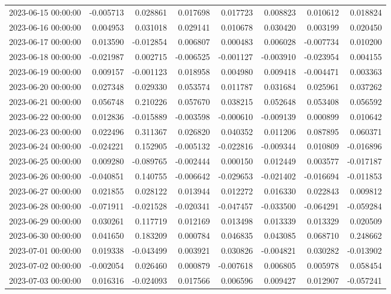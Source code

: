 \begin{tabular}{lrrrrrrr}
2023-06-15 00:00:00 & -0.005713 & 0.028861 & 0.017698 & 0.017723 & 0.008823 & 0.010612 & 0.018824 \\
2023-06-16 00:00:00 & 0.004953 & 0.031018 & 0.029141 & 0.010678 & 0.030420 & 0.003199 & 0.020450 \\
2023-06-17 00:00:00 & 0.013590 & -0.012854 & 0.006807 & 0.000483 & 0.006028 & -0.007734 & 0.010200 \\
2023-06-18 00:00:00 & -0.021987 & 0.002715 & -0.006525 & -0.001127 & -0.003910 & -0.023954 & 0.004155 \\
2023-06-19 00:00:00 & 0.009157 & -0.001123 & 0.018958 & 0.004980 & 0.009418 & -0.004471 & 0.003363 \\
2023-06-20 00:00:00 & 0.027348 & 0.029330 & 0.053574 & 0.011787 & 0.031684 & 0.025961 & 0.037262 \\
2023-06-21 00:00:00 & 0.056748 & 0.210226 & 0.057670 & 0.038215 & 0.052648 & 0.053408 & 0.056592 \\
2023-06-22 00:00:00 & 0.012836 & -0.015889 & -0.003598 & -0.000610 & -0.009139 & 0.000899 & 0.010642 \\
2023-06-23 00:00:00 & 0.022496 & 0.311367 & 0.026820 & 0.040352 & 0.011206 & 0.087895 & 0.060371 \\
2023-06-24 00:00:00 & -0.024221 & 0.152905 & -0.005132 & -0.022816 & -0.009344 & 0.010809 & -0.016896 \\
2023-06-25 00:00:00 & 0.009280 & -0.089765 & -0.002444 & 0.000150 & 0.012449 & 0.003577 & -0.017187 \\
2023-06-26 00:00:00 & -0.040851 & 0.140755 & -0.006642 & -0.029653 & -0.021402 & -0.016694 & -0.011853 \\
2023-06-27 00:00:00 & 0.021855 & 0.028122 & 0.013944 & 0.012272 & 0.016330 & 0.022843 & 0.009812 \\
2023-06-28 00:00:00 & -0.071911 & -0.021528 & -0.020341 & -0.047457 & -0.033500 & -0.064291 & -0.059284 \\
2023-06-29 00:00:00 & 0.030261 & 0.117719 & 0.012169 & 0.013498 & 0.013339 & 0.013329 & 0.020509 \\
2023-06-30 00:00:00 & 0.041650 & 0.183209 & 0.000784 & 0.046835 & 0.043085 & 0.068710 & 0.248662 \\
2023-07-01 00:00:00 & 0.019338 & -0.043499 & 0.003921 & 0.030826 & -0.004821 & 0.030282 & -0.013902 \\
2023-07-02 00:00:00 & -0.002054 & 0.026460 & 0.000879 & -0.007618 & 0.006805 & 0.005978 & 0.058454 \\
2023-07-03 00:00:00 & 0.016316 & -0.024093 & 0.017566 & 0.006596 & 0.009427 & 0.012907 & -0.057241 \\

\end{tabular}
